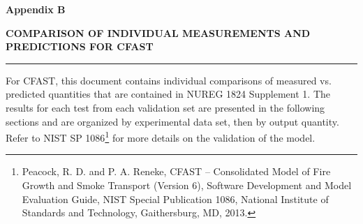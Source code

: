 \documentclass[12pt, titlepage, twoside]{article}
\begin{document}
\thispagestyle{empty}

\huge
\noindent \textbf{Appendix B}

\vspace{0.5em}
\LARGE
\noindent \textbf{COMPARISON OF INDIVIDUAL MEASUREMENTS AND PREDICTIONS FOR CFAST}

\normalsize

\vspace{1.5em}
\hrule
\vspace{1.0em}

For CFAST, this document contains individual comparisons of measured vs. predicted quantities that are contained in NUREG 1824 Supplement 1. The results for each test from each validation set are presented in the following sections and are organized by experimental data set, then by output quantity. Refer to NIST SP 1086\footnote{Peacock, R. D. and P. A. Reneke, CFAST -- Consolidated Model of Fire Growth and Smoke Transport (Version 6), Software Development and Model Evaluation Guide, NIST Special Publication 1086, National Institute of Standards and Technology, Gaithersburg, MD, 2013.} for more details on the validation of the model.

\clearpage
{}
\thispagestyle{empty}
\tableofcontents

\appendix

\setcounter{section}{1}


\end{document}

